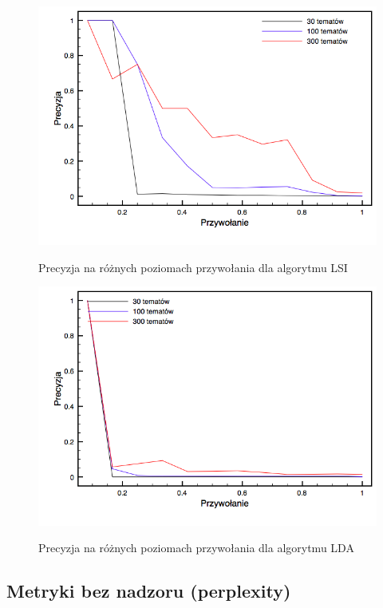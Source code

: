 \documentclass[11pt,a4paper]{article}
\begin{document}
\begin{figure}[h]
\caption{Precyzja na różnych poziomach przywołania dla algorytmu LSI}
\includegraphics[width=\linewidth]{gfx/lsi_precision.png}
\label{fig:lsi_precision}
\end{figure}

\begin{figure}[h]
\caption{Precyzja na różnych poziomach przywołania dla algorytmu LDA}
\includegraphics[width=\linewidth]{gfx/lda_precision.png}
\label{fig:lda_precision}
\end{figure}

\FloatBarrier

\subsection{Metryki bez nadzoru (perplexity)}
\end{document}

